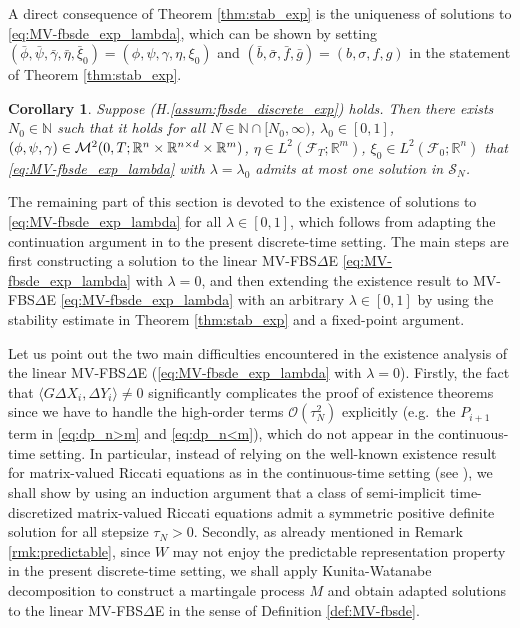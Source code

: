 \documentclass[11pt]{article}
\numberwithin{equation}{section}
\newtheorem{Corollary}[Theorem]{Corollary}
\theoremstyle{definition}
\theoremstyle{remark}
\def\l{\label}  \def\f{\frac}  \def\fa{\forall}
\def \la{\langle} \def\ra{\rangle}
\def\cF{\mathcal{F}}
\def\cM{\mathcal{M}}
\def\cO{\mathcal{O}}
\def\cS{\mathcal{S}}
\def\sN{{\mathbb{N}}}
\def\sR{{\mathbb R}}
\newcommand{\fbsde}{FBS$\Delta$E }
\begin{document}
A direct consequence of Theorem \ref{thm:stab_exp}
is the uniqueness of solutions to \eqref{eq:MV-fbsde_exp_lambda},
which can be shown by setting 
$(\bar{\phi},\bar{\psi},\bar{\gamma},\bar{\eta},\bar{\xi}_0)=(\phi,\psi,\gamma,\eta,{\xi}_0)$
and $(\bar{b},\bar{\sigma},\bar{f},\bar{g})=({b},{\sigma},{f},{g})$ 
in the statement of Theorem \ref{thm:stab_exp}.

\begin{Corollary}\l{cor:uniqueness_bwd_imp}
Suppose  (H.\ref{assum:fbsde_discrete_exp}) holds.
Then
there exists $N_0\in \sN$ such that
it holds for all  $N\in \sN\cap[N_0,\infty)$, $\lambda_0\in [0,1]$,
 $(\phi,\psi,\gamma)\in \cM^2(0,T; \sR^n\t \sR^{n\t d}\t \sR^m)$, 
 $\eta\in L^2(\cF_T;\sR^m)$,
  $\xi_0\in L^2(\cF_0;\sR^n)$
that 
 \eqref{eq:MV-fbsde_exp_lambda} with $\lambda=\lambda_0$ admits at most one solution in $\cS_N$.
\end{Corollary}



The remaining part of this section is devoted to  the existence of solutions to \eqref{eq:MV-fbsde_exp_lambda}
for all $\lambda\in [0,1]$,
which follows from 
 adapting   the  continuation argument in \cite{peng1999,bensoussan2015} to the present discrete-time setting.
The main steps are first constructing a solution to the linear MV-\fbsde \eqref{eq:MV-fbsde_exp_lambda} with $\lambda=0$,
and then extending the existence result to MV-\fbsde \eqref{eq:MV-fbsde_exp_lambda} with an arbitrary $\lambda\in [0,1]$
by using the stability estimate in Theorem \ref{thm:stab_exp} and a fixed-point argument.


Let us point out the two main difficulties encountered 
in the existence analysis of the linear MV-\fbsde (\eqref{eq:MV-fbsde_exp_lambda} with $\lambda=0$).
Firstly,
the fact that $\la G \Delta X_i,\Delta Y_i  \ra\not =0$ 
significantly
complicates the   proof of existence theorems since we have to
  handle the  high-order terms $\cO(\tau_N^2)$ explicitly
  (e.g.~the $P_{i+1}$ term in \eqref{eq:dp_n>m} and \eqref{eq:dp_n<m}),
which do not appear in the continuous-time setting.
In particular, 
instead of relying on the well-known existence result for  matrix-valued Riccati
equations as in the continuous-time setting (see \cite[Lemma 2.5]{peng1999}),
we  shall show 
by using an  induction argument
that
 a class of semi-implicit time-discretized matrix-valued Riccati equations admit a symmetric positive definite solution
 for all  stepsize $\tau_N>0$.
Secondly, 
as already mentioned in Remark \ref{rmk:predictable},
since $W$ may not enjoy   the predictable representation property
in the present discrete-time setting,
we shall  apply  Kunita-Watanabe decomposition 
to construct   a martingale process $M$ 
and obtain adapted solutions to the linear MV-FBS$\Delta$E
 in the sense of Definition \ref{def:MV-fbsde}.
\end{document}
